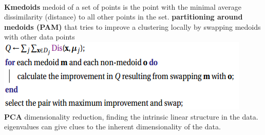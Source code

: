 \documentclass[cheatsheet.tex]{subfiles}
\begin{document}
\\
\textbf{Kmedoids} medoid of a set of points is the point with the minimal average dissimilarity (distance) to all other points in the set. \textbf{partitioning around medoids (PAM)} that tries to improve a clustering locally by swapping medoids with other data points\\
\includegraphics[width=.8\linewidth]{pam.png}
\\
\textbf{PCA} dimensionality reduction, finding the intrinsic linear structure in the data. eigenvalues can give clues to the inherent dimensionality of the data. 
\end{document}
